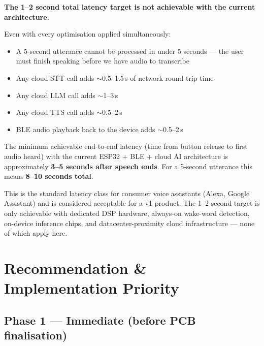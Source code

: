 \documentclass[12pt,a4paper]{article}
\begin{document}
\begin{constraintbox}
\textbf{The 1--2 second total latency target is not achievable with the current architecture.}

Even with every optimisation applied simultaneously:
\begin{itemize}[leftmargin=1.5em]
  \item A 5-second utterance cannot be processed in under 5 seconds — the user must finish
        speaking before we have audio to transcribe
  \item Any cloud STT call adds $\sim$0.5--1.5\,s of network round-trip time
  \item Any cloud LLM call adds $\sim$1--3\,s
  \item Any cloud TTS call adds $\sim$0.5--2\,s
  \item BLE audio playback back to the device adds $\sim$0.5--2\,s
\end{itemize}

The minimum achievable end-to-end latency (time from button release to first audio heard) with
the current ESP32 + BLE + cloud AI architecture is approximately \textbf{3--5 seconds after
speech ends}. For a 5-second utterance this means \textbf{8--10 seconds total}.

This is the standard latency class for consumer voice assistants (Alexa, Google Assistant) and
is considered acceptable for a v1 product. The 1--2 second target is only achievable with
dedicated DSP hardware, always-on wake-word detection, on-device inference chips, and
datacenter-proximity cloud infrastructure — none of which apply here.
\end{constraintbox}

\section{Recommendation \& Implementation Priority}

\subsection{Phase 1 — Immediate (before PCB finalisation)}
\end{document}
